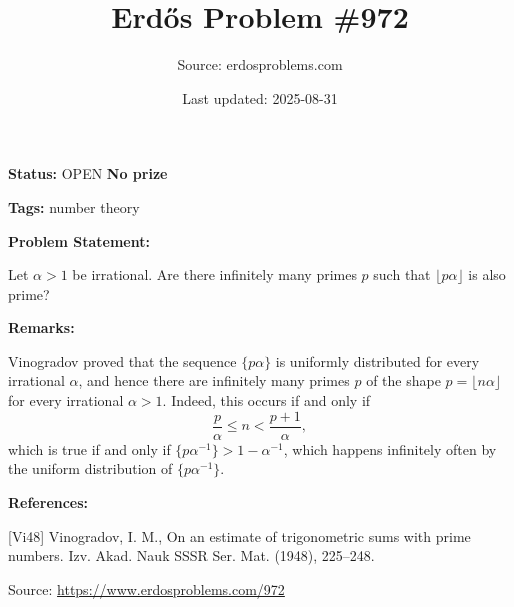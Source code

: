 \documentclass{article}
\title{Erd\H{o}s Problem \#972}
\date{Last updated: 2025-08-31}
\author{Source: erdosproblems.com}
\begin{document}
\maketitle

\noindent\textbf{Status:} OPEN \quad \textbf{No prize}

\noindent\textbf{Tags:} number theory

\medskip
\noindent\textbf{Problem Statement:}

Let $\alpha>1$ be irrational. Are there infinitely many primes $p$ such that $\lfloor p\alpha\rfloor$ is also prime?

\bigskip
\noindent\textbf{Remarks:}

Vinogradov \cite{Vi48} proved that the sequence $\{p\alpha\}$ is uniformly distributed for every irrational $\alpha$, and hence there are infinitely many primes $p$ of the shape $p=\lfloor n\alpha\rfloor$ for every irrational $\alpha>1$. Indeed, this occurs if and only if\[\frac{p}{\alpha}\leq n<\frac{p+1}{\alpha},\]which is true if and only if $\{p\alpha^{-1}\}>1-\alpha^{-1}$, which happens infinitely often by the uniform distribution of $\{p\alpha^{-1}\}$.

\bigskip
\noindent\textbf{References:}

[Vi48] Vinogradov, I. M., On an estimate of trigonometric sums with prime numbers. Izv. Akad. Nauk SSSR Ser. Mat. (1948), 225--248.

\bigskip
\noindent\small{Source: \url{https://www.erdosproblems.com/972}}
\end{document}
